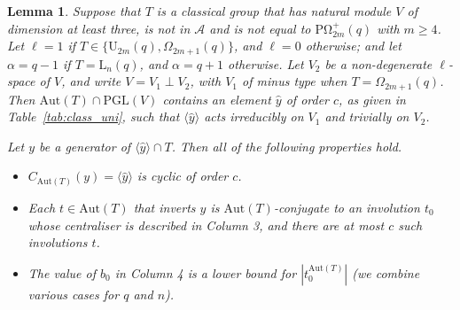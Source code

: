 \documentclass[twoside,a4paper,reqno,11pt]{amsart}
\newcommand{\<}{\langle}
\renewcommand{\>}{\rangle}
\newcommand{\la}{\langle}
\newcommand{\ra}{\rangle}
\newcommand{\geqs}{\geqslant}
\newcommand{\Aut}{\mathrm{Aut}}
\newcommand{\PGL}{\mathrm{PGL}}
\newcommand{\POmega}{\mathrm{P\Omega}}
\newcommand{\LL}{\mathrm{L}}
\newcommand{\UU}{\mathrm{U}}
\newtheorem{lem}[thm]{Lemma}
\theoremstyle{definition}
\begin{document}
\begin{lem}\label{l:class_uni} 
Suppose that $T$ is a classical group that has natural module $V$ of dimension at least three, is not in $\mathcal{A}$ and is not equal to $\POmega_{2m}^+(q)$ with $m\geqs 4$.  Let $\ell = 1$ if  $T  \in \{\UU_{2m}(q), \Omega_{2m+1}(q)\}$, and $\ell = 0$ otherwise; and let $\alpha = q-1$ if $T = \LL_n(q)$, and $\alpha = q+1$ otherwise. 
Let $V_2$ be a non-degenerate $\ell$-space of $V$, and write $V = V_1 \perp V_2$, with $V_1$ of minus type when $T = \Omega_{2m+1}(q)$.
Then $\Aut(T) \cap \PGL(V)$ contains an element $\widehat{y}$ of order $c$, as given in %
Table~\ref{tab:class_uni}, such that
$\la \widehat{y} \ra$ acts irreducibly on $V_1$ and trivially on $V_2$.

Let $y$ be a generator of $\la \widehat{y} \ra \cap T$.
Then all of the following properties hold.
    \begin{itemize}\addtolength{\itemsep}{0.2\baselineskip}
		\item[{\rm (i)}] $C_{\Aut(T)}(y) = \la \widehat{y} \ra$ is cyclic of order $c$.
		\item[{\rm (ii)}] Each $t\in\Aut(T)$ that inverts $y$ is $\Aut(T)$-conjugate to an involution $t_0$ whose centraliser is described in Column 3, and there are at most $c$ such involutions $t$. 
        \item[{\rm (iii)}] The value of $b_0$ in Column 4 is a  lower bound for $|t_0^{\Aut(T)}|$ (we combine various cases for $q$ and $n$). 
    \end{itemize}
\end{lem}
\end{document}
